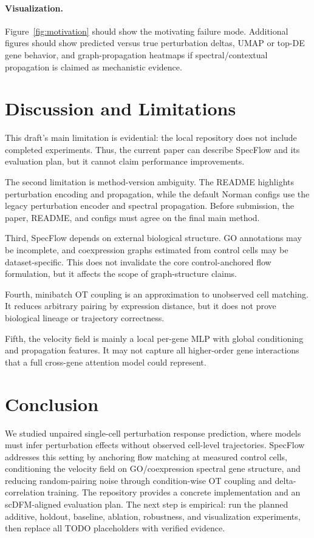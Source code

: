 \documentclass[11pt]{article}
\newcommand{\method}{SpecFlow}
\DeclareRobustCommand{\code}[1]{\texttt{\detokenize{#1}}}
\begin{document}
\paragraph{Visualization.}
Figure~\ref{fig:motivation} should show the motivating failure mode.
Additional figures should show predicted versus true perturbation deltas, UMAP or top-DE gene behavior, and graph-propagation heatmaps if spectral/contextual propagation is claimed as mechanistic evidence.

\section{Discussion and Limitations}

This draft's main limitation is evidential: the local repository does not include completed experiments.
Thus, the current paper can describe \method{} and its evaluation plan, but it cannot claim performance improvements.

The second limitation is method-version ambiguity.
The README highlights \code{graph\_pool} perturbation encoding and \code{contextual\_local} propagation, while the default Norman configs use the legacy perturbation encoder and spectral propagation.
Before submission, the paper, README, and configs must agree on the final main method.

Third, \method{} depends on external biological structure.
GO annotations may be incomplete, and coexpression graphs estimated from control cells may be dataset-specific.
This does not invalidate the core control-anchored flow formulation, but it affects the scope of graph-structure claims.

Fourth, minibatch OT coupling is an approximation to unobserved cell matching.
It reduces arbitrary pairing by expression distance, but it does not prove biological lineage or trajectory correctness.

Fifth, the velocity field is mainly a local per-gene MLP with global conditioning and propagation features.
It may not capture all higher-order gene interactions that a full cross-gene attention model could represent.

\section{Conclusion}

We studied unpaired single-cell perturbation response prediction, where models must infer perturbation effects without observed cell-level trajectories.
\method{} addresses this setting by anchoring flow matching at measured control cells, conditioning the velocity field on GO/coexpression spectral gene structure, and reducing random-pairing noise through condition-wise OT coupling and delta-correlation training.
The repository provides a concrete implementation and an scDFM-aligned evaluation plan.
The next step is empirical: run the planned additive, holdout, baseline, ablation, robustness, and visualization experiments, then replace all TODO placeholders with verified evidence.
\end{document}
